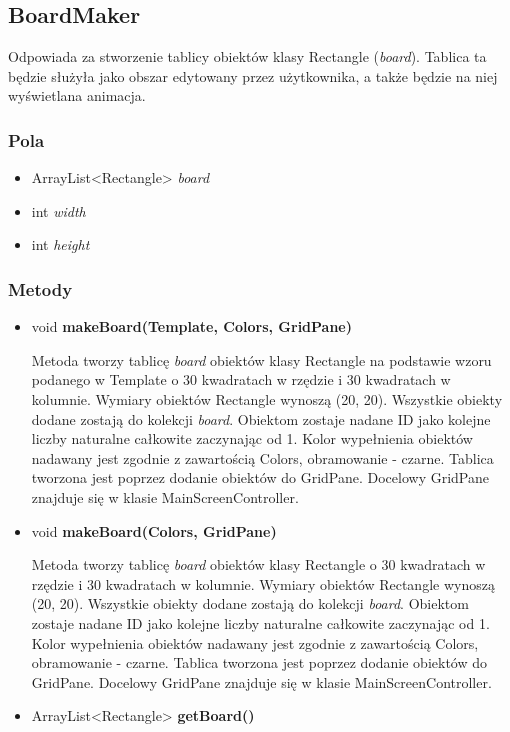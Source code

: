 \documentclass[a4paper,11pt]{article}
\begin{document}
\subsection{BoardMaker}
Odpowiada za stworzenie tablicy obiektów klasy Rectangle (\textit{board}). Tablica ta będzie służyła jako obszar edytowany przez użytkownika, a także będzie na niej wyświetlana animacja.
\subsubsection{Pola}
\begin{itemize}
\item ArrayList<Rectangle> \textit{board}
\item int \textit{width}
\item int \textit{height}
\end{itemize}
\subsubsection{Metody}
\begin{itemize}
\item void \textbf{makeBoard(Template, Colors, GridPane)}

Metoda tworzy tablicę \textit{board} obiektów klasy Rectangle na podstawie wzoru podanego w Template o 30 kwadratach w rzędzie i 30 kwadratach w kolumnie.
Wymiary obiektów Rectangle wynoszą (20, 20).
Wszystkie obiekty dodane zostają do kolekcji \textit{board}.
Obiektom zostaje nadane ID jako kolejne liczby naturalne całkowite zaczynając od 1.
Kolor wypełnienia obiektów nadawany jest zgodnie z zawartością Colors, obramowanie - czarne.
Tablica tworzona jest poprzez dodanie obiektów do  GridPane.
Docelowy GridPane znajduje się w klasie MainScreenController.
\item void \textbf{makeBoard(Colors, GridPane)}

Metoda tworzy tablicę \textit{board} obiektów klasy Rectangle o 30 kwadratach w rzędzie i 30 kwadratach w kolumnie.
Wymiary obiektów Rectangle wynoszą (20, 20).
Wszystkie obiekty dodane zostają do kolekcji \textit{board}.
Obiektom zostaje nadane ID jako kolejne liczby naturalne całkowite zaczynając od 1.
Kolor wypełnienia obiektów nadawany jest zgodnie z zawartością Colors, obramowanie - czarne.
Tablica tworzona jest poprzez dodanie obiektów do  GridPane.
Docelowy GridPane znajduje się w klasie MainScreenController.

\item ArrayList<Rectangle> \textbf{getBoard()}
\end{itemize}
\end{document}
